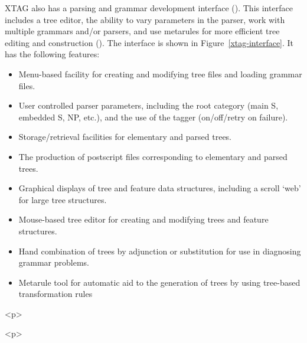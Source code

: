 XTAG also has a parsing and grammar development interface 
(\cite{PSJ92}). This interface includes a tree editor, the ability to 
vary parameters in the parser, work with multiple grammars and/or 
parsers, and use metarules for more efficient tree editing and 
construction (\cite{becker94}). The interface is shown in 
Figure~\ref{xtag-interface}. It has the following features: 
 
\begin{itemize} 
 
\item Menu-based facility for creating and modifying tree files and 
loading grammar files. 
 
\item User controlled parser parameters, including the root 
category (main S, embedded S, NP, etc.), and the use of the tagger 
(on/off/retry on failure). 
 
\item Storage/retrieval facilities for elementary and parsed trees. 
 
\item The production of postscript files corresponding to elementary 
and parsed trees. 
 
\item Graphical displays of tree and feature data structures, 
including a scroll `web' for large tree structures. 
 
\item Mouse-based tree editor for creating and modifying trees and 
feature structures. 
 
\item Hand combination of trees by adjunction or substitution for use 
in diagnosing grammar problems. 
 
\item Metarule tool for automatic aid to the generation of trees by using 
tree-based transformation rules 
 
\end{itemize} 
 
\begin{rawhtml} <p> \end{rawhtml}
\centering 
\mbox{} 
{} 
\begin{rawhtml} <dl> <dt>[XTAG Interface]{Interface to the XTAG system <p> </dl> \end{rawhtml}
\label{xtag-interface} 
\begin{rawhtml} <p> \end{rawhtml}
 
